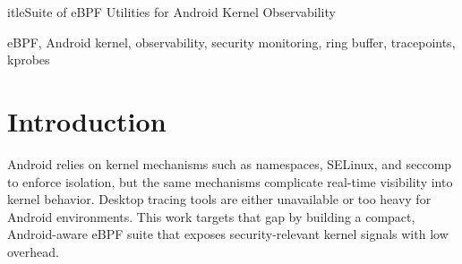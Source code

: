 \documentclass[conference]{IEEEtran}
\begin{document}
	itle{Suite of eBPF Utilities for Android Kernel Observability}

\author{
\and
{}
}

\maketitle

\begin{abstract}
Android devices expose limited kernel observability compared to server Linux, yet mobile threats increasingly rely on short-lived processes, rapid privilege transitions, and stealthy file and network activity. This paper presents a suite of five eBPF utilities tailored to Android kernels: Procwatch (process lifecycle), Execguard (exec rate anomalies), Priviwatch (credential transitions), Filewatch (VFS activity), and Pktrace (ingress packet tracing). The tools are verifier-friendly, rely on stable hook points where possible, and deliver structured events to user space via ring buffers. We validate the suite on an Android 14 emulator with a Debian chroot toolchain and show that each tool produces actionable, low-noise output under realistic test scenarios with minimal overhead. The result is a practical and deployable foundation for Android kernel monitoring without system image modification.
\end{abstract}

\begin{IEEEkeywords}
eBPF, Android kernel, observability, security monitoring, ring buffer, tracepoints, kprobes
\end{IEEEkeywords}

\section{Introduction}
Android relies on kernel mechanisms such as namespaces, SELinux, and seccomp to enforce isolation, but the same mechanisms complicate real-time visibility into kernel behavior. Desktop tracing tools are either unavailable or too heavy for Android environments. This work targets that gap by building a compact, Android-aware eBPF suite that exposes security-relevant kernel signals with low overhead.
\end{document}

